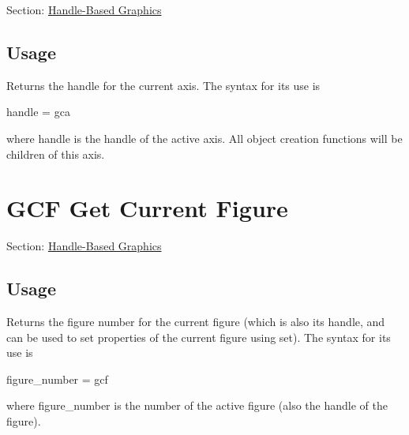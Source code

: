 Section\-: \hyperlink{sec_handle}{Handle-\/\-Based Graphics} \hypertarget{vtkwidgets_vtkxyplotwidget_Usage}{}\subsection{Usage}\label{vtkwidgets_vtkxyplotwidget_Usage}
Returns the handle for the current axis. The syntax for its use is \begin{DoxyVerb}  handle = gca
\end{DoxyVerb}
 where {\ttfamily handle} is the handle of the active axis. All object creation functions will be children of this axis. \hypertarget{handle_gcf}{}\section{G\-C\-F Get Current Figure}\label{handle_gcf}
Section\-: \hyperlink{sec_handle}{Handle-\/\-Based Graphics} \hypertarget{vtkwidgets_vtkxyplotwidget_Usage}{}\subsection{Usage}\label{vtkwidgets_vtkxyplotwidget_Usage}
Returns the figure number for the current figure (which is also its handle, and can be used to set properties of the current figure using {\ttfamily set}). The syntax for its use is \begin{DoxyVerb}  figure_number = gcf
\end{DoxyVerb}
 where {\ttfamily figure\-\_\-number} is the number of the active figure (also the handle of the figure).

